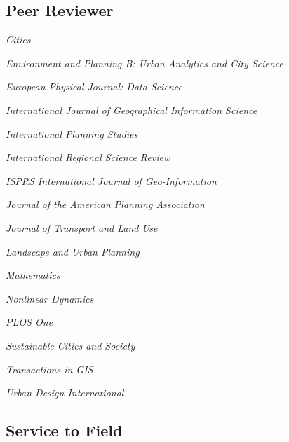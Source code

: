 \documentclass[12pt,letterpaper]{report}
\newcommand{\listitemspace}{0.15em}
\renewenvironment{itemize}
{\begin{list}{}{\setlength{\leftmargin}{0em}
			\setlength{\parskip}{0em}
			\setlength{\itemsep}{\listitemspace}
			\setlength{\parsep}{\listitemspace}}}
	{\end{list}}
\begin{document}
	\subsection*{Peer Reviewer}
	
	\begin{itemize}
		
		\item \textit{Cities}
		
		\item \textit{Environment and Planning B: Urban Analytics and City Science}
		
		\item \textit{European Physical Journal: Data Science}
		
		\item \textit{International Journal of Geographical Information Science}
		
		\item \textit{International Planning Studies}

		\item \textit{International Regional Science Review}
		
		\item \textit{ISPRS International Journal of Geo-Information}
		
		\item \textit{Journal of the American Planning Association}
		
		\item \textit{Journal of Transport and Land Use}
		
		\item \textit{Landscape and Urban Planning}
		
		\item \textit{Mathematics}
		
		\item \textit{Nonlinear Dynamics}
		
		\item \textit{PLOS One}
		
		\item \textit{Sustainable Cities and Society}
		
		\item \textit{Transactions in GIS}
		
		\item \textit{Urban Design International}
		
	\end{itemize}
	
	\subsection*{Service to Field}
	
\end{document}
